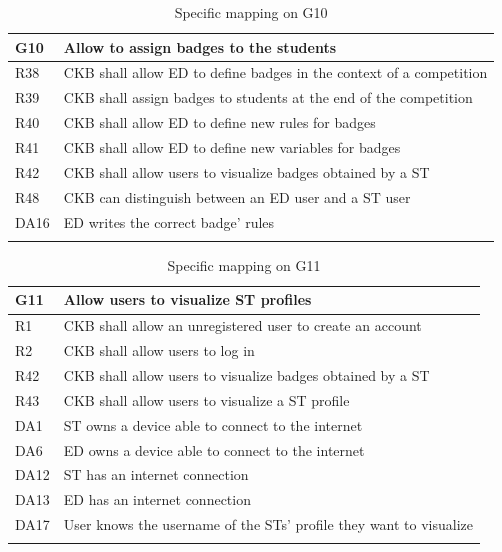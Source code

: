   \begin{longtable}{|l|p{12cm}|}
    \hline
    \textbf{G10} & \textbf{Allow to assign badges to the students}      \\
    \hline
    R38 & CKB shall allow ED to define badges in the context of a competition \\
    \hline
    R39 & CKB shall assign badges to students at the end of the competition \\
    \hline
    R40 & CKB shall allow ED to define new rules for badges \\
    \hline
    R41 & CKB shall allow ED to define new variables for badges \\
    \hline
    R42 & CKB shall allow users to visualize badges obtained by a ST \\
    \hline
    R48 & CKB can distinguish between an ED user and a ST user \\
    \hline
    DA16 & ED writes the correct badge’ rules \\
    \hline

    \caption{Specific mapping on G10}
    \label{tab:mappingG10}
  \end{longtable}

  \begin{longtable}{|l|p{12cm}| }
    \hline
    \textbf{G11} & \textbf{Allow users to visualize ST profiles}      \\
    \hline
    R1 & CKB shall allow an unregistered user to create an account \\
    \hline
    R2 & CKB shall allow users to log in \\
    \hline
    R42 & CKB shall allow users to visualize badges obtained by a ST \\
    \hline
    R43 & CKB shall allow users to visualize a ST profile \\
    \hline
    DA1 & ST owns a device able to connect to the internet \\
    \hline
    DA6 & ED owns a device able to connect to the internet \\
    \hline
    DA12 & ST has an internet connection \\
    \hline
    DA13 & ED has an internet connection \\
    \hline
    DA17 & User knows the username of the STs' profile they want to visualize \\
    \hline
    \caption{Specific mapping on G11}
    \label{tab:mappingG11}
  \end{longtable}

